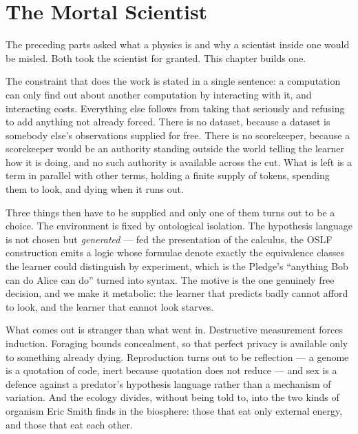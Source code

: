 \chapter{The Mortal Scientist}
\label{ch:sci}

\noindent
The preceding parts asked what a physics is and why a scientist inside one
would be misled. Both took the scientist for granted. This chapter builds one.

The constraint that does the work is stated in a single sentence: a
computation can only find out about another computation by interacting with
it, and interacting costs. Everything else follows from taking that
seriously and refusing to add anything not already forced. There is no
dataset, because a dataset is somebody else's observations supplied for
free. There is no scorekeeper, because a scorekeeper would be an authority
standing outside the world telling the learner how it is doing, and no such
authority is available across the cut. What is left is a term in parallel
with other terms, holding a finite supply of tokens, spending them to look,
and dying when it runs out.

Three things then have to be supplied and only one of them turns out to be a
choice. The environment is fixed by ontological isolation. The hypothesis
language is not chosen but \emph{generated} --- fed the presentation of the
calculus, the OSLF construction emits a logic whose formulae denote exactly
the equivalence classes the learner could distinguish by experiment, which is
the Pledge's ``anything Bob can do Alice can do'' turned into syntax. The
motive is the one genuinely free decision, and we make it metabolic: the
learner that predicts badly cannot afford to look, and the learner that
cannot look starves.

What comes out is stranger than what went in. Destructive measurement forces
induction. Foraging bounds concealment, so that perfect privacy is available
only to something already dying. Reproduction turns out to be reflection ---
a genome is a quotation of code, inert because quotation does not reduce ---
and sex is a defence against a predator's hypothesis language rather than a
mechanism of variation. And the ecology divides, without being told to, into
the two kinds of organism Eric Smith finds in the biosphere: those that eat
only external energy, and those that eat each other.

